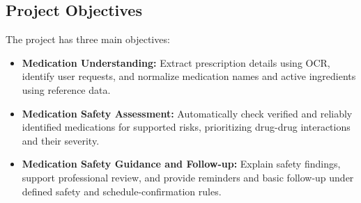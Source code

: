 \subsection{Project Objectives}

The project has three main objectives:

\begin{itemize}
    \item \textbf{Medication Understanding:}
    Extract prescription details using OCR, identify user requests, and normalize medication names and active ingredients using reference data.

    \item \textbf{Medication Safety Assessment:}
    Automatically check verified and reliably identified medications for supported risks, prioritizing drug-drug interactions and their severity.
    
    \item \textbf{Medication Safety Guidance and Follow-up:}
    Explain safety findings, support professional review, and provide reminders and basic follow-up under defined safety and schedule-confirmation rules.
\end{itemize}
